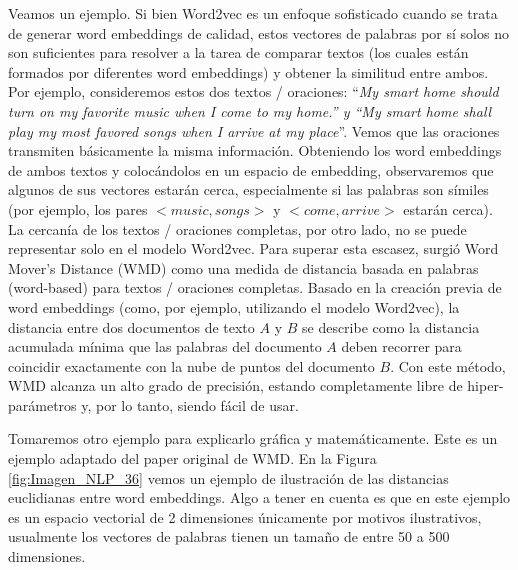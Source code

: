 \documentclass[12pt,a4paper]{article}
\begin{document}
\begin{sloppypar}
Veamos un ejemplo\cite{NLP_20}. Si bien Word2vec es un enfoque sofisticado cuando se trata de generar word embeddings de calidad, estos vectores de palabras por sí solos no son suficientes para resolver a la tarea de comparar textos (los cuales están formados por diferentes word embeddings) y obtener la similitud entre ambos. Por ejemplo, consideremos estos dos textos / oraciones: “\textit{My smart home should turn on my favorite music when I come to my home.” y “My smart home shall play my most favored songs when I arrive at my place}”. Vemos que las oraciones transmiten básicamente la misma información. Obteniendo los word embeddings de ambos textos y colocándolos en un espacio de embedding, observaremos que algunos de sus vectores estarán cerca, especialmente si las palabras son símiles (por ejemplo, los pares $<music, songs>$  y  $<come, arrive>$  estarán cerca). La cercanía de los textos / oraciones completas, por otro lado, no se puede representar solo en el modelo Word2vec. Para superar esta escasez, surgió Word Mover's Distance (WMD) como una medida de distancia basada en palabras (word-based) para textos / oraciones completas. Basado en la creación previa de word embeddings (como, por ejemplo, utilizando el modelo Word2vec), la distancia entre dos documentos de texto $A$ y $B$ se describe como la distancia acumulada mínima que las palabras del documento $A$ deben recorrer para coincidir exactamente con la nube de puntos del documento $B$. Con este método, WMD alcanza un alto grado de precisión, estando completamente libre de hiper-parámetros y, por lo tanto, siendo fácil de usar.

Tomaremos otro ejemplo\cite{NLP_21} para explicarlo gráfica y matemáticamente. Este es un ejemplo adaptado del paper original de WMD\cite{wmd_paper}. En la Figura \ref{fig:Imagen_NLP_36} vemos un ejemplo de ilustración de las distancias euclidianas entre word embeddings. Algo a tener en cuenta es que en este ejemplo es un espacio vectorial de 2 dimensiones únicamente por motivos ilustrativos, usualmente los vectores de palabras tienen un tamaño de entre 50 a 500 dimensiones.


\end{sloppypar}
\end{document}
